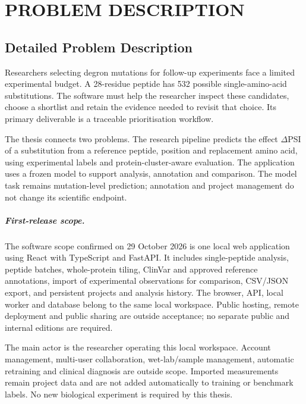 \ThesisChapterNumbering
{}
\chapter{PROBLEM DESCRIPTION}\label{chap:problem}

\section{Detailed Problem Description}
Researchers selecting degron mutations for follow-up experiments face a limited experimental budget.
A 28-residue peptide has 532 possible single-amino-acid substitutions. The software must help the
researcher inspect these candidates, choose a shortlist and retain the evidence needed to revisit
that choice. Its primary deliverable is a traceable prioritisation workflow.

The thesis connects two problems. The research pipeline predicts the effect $\Delta$PSI of a
substitution from a reference peptide, position and replacement amino acid, using experimental
labels and protein-cluster-aware evaluation. The application uses a frozen model to support
analysis, annotation and comparison. The model task remains mutation-level prediction; annotation
and project management do not change its scientific endpoint.

\paragraph{First-release scope.}
The software scope confirmed on 29 October 2026 is one local web application using React with
TypeScript and FastAPI. It includes single-peptide analysis, peptide batches, whole-protein tiling,
ClinVar and approved reference annotations, import of experimental observations for comparison,
CSV/JSON export, and persistent projects and analysis history. The browser, API, local worker and
database belong to the same local workspace. Public hosting, remote deployment and public sharing
are outside acceptance; no separate public and internal editions are required.

The main actor is the researcher operating this local workspace. Account management, multi-user
collaboration, wet-lab/sample management, automatic retraining and clinical diagnosis are outside
scope. Imported measurements remain project data and are not added automatically to training or
benchmark labels. No new biological experiment is required by this thesis.

